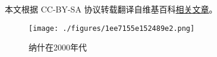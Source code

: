 
本文根据 CC-BY-SA 协议转载翻译自维基百科\href{https://en.wikipedia.org/wiki/John_Forbes_Nash_Jr.}{相关文章}。

\begin{figure}[ht]
\centering
\texttt{[image: ./figures/1ee7155e152489e2.png]}
\caption{纳什在2000年代} \label{fig_JFNJY_1}
\end{figure}